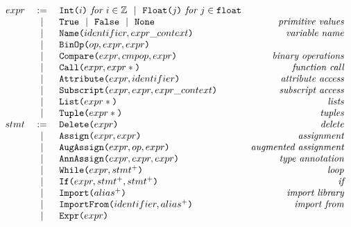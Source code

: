 \begin{figure}
\[\begin{array}{rclr}
    expr  &:=& \texttt{Int(}i\texttt{)} \textit{ for } i \in \mathbb{Z}
          ~~|~~ \texttt{Float(}j\texttt{)} \textit{ for } j \in \texttt{float} \\
          &~~|~~& \texttt{True}
          ~~|~~ \texttt{False} ~~|~~ \texttt{None}   & \textit{primitive values} \\
     &~~|~~& \texttt{Name(}identifier, expr\_context\texttt{)} & \textit{variable name} \\
     &~~|~~& \texttt{BinOp(}op, expr, expr\texttt{)} \\
     &~~|~~&   \texttt{Compare(}expr, cmpop, expr\texttt{)}             & \textit{binary operations} \\
     &~~|~~& \texttt{Call(}expr, expr*\texttt{)}                    & \textit{function call} \\
     &~~|~~& \texttt{Attribute(}expr, identifier\texttt{)}          & \textit{attribute access} \\
     &~~|~~& \texttt{Subscript(}expr, expr, expr\_context\texttt{)} & \textit{subscript access} \\
     &~~|~~& \texttt{List(}expr*\texttt{)}                          & \textit{lists} \\
     &~~|~~& \texttt{Tuple(}expr*\texttt{)}                         & \textit{tuples} \\

  stmt &:=& \texttt{Delete(}expr\texttt{)}                      & \textit{delete} \\
     &~~|~~& \texttt{Assign(}expr, expr\texttt{)}              & \textit{assignment} \\
     &~~|~~& \texttt{AugAssign(}expr, op, expr\texttt{)}       & \textit{augmented assignment} \\
     &~~|~~& \texttt{AnnAssign(}expr, expr, expr\texttt{)}     & \textit{type annotation} \\
     &~~|~~& \texttt{While(}expr, stmt^+\texttt{)}             & \textit{loop} \\
     &~~|~~& \texttt{If(}expr, stmt^+, stmt^+\texttt{)}        & \textit{if} \\
     &~~|~~& \texttt{Import(}alias^+\texttt{)}                 & \textit{import library} \\
     &~~|~~& \texttt{ImportFrom(}identifier, alias^+\texttt{)} & \textit{import from} \\
     &~~|~~& \texttt{Expr(}expr\texttt{)}                      & \\


\end{array}\]
\end{figure}
